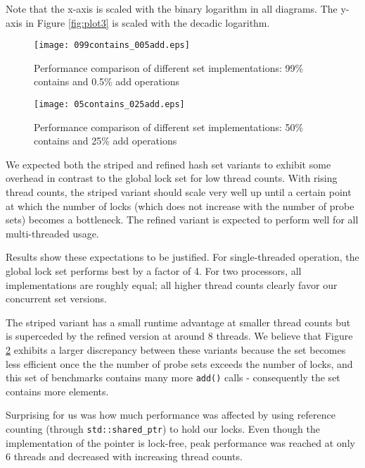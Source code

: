 \documentclass[a4paper,10pt]{article}
\begin{document}
Note that the x-axis is scaled with the binary logarithm in all diagrams. The
y-axis in Figure \ref{fig:plot3} is scaled with the decadic logarithm.

\begin{figure}[H]
\begin{center}
\texttt{[image: 099contains\_005add.eps]}
\end{center}
\caption{Performance comparison of different set implementations: 99\% contains
    and 0.5\% add operations}
\label{fig:plot1}
\end{figure}

\begin{figure}[H]
\begin{center}
\texttt{[image: 05contains\_025add.eps]}
\end{center}
\caption{Performance comparison of different set implementations: 50\% contains
    and 25\% add operations}
\label{fig:plot2}
\end{figure}

We expected both the striped and refined hash set variants to exhibit some
overhead in contrast to the global lock set for low thread counts. With rising
thread counts, the striped variant should scale very well up until a certain
point at which the number of locks (which does not increase with the number of
probe sets) becomes a bottleneck. The refined variant is expected to perform
well for all multi-threaded usage.

Results show these expectations to be justified. For single-threaded operation,
the global lock set performs best by a factor of 4. For two processors, all
implementations are roughly equal; all higher thread counts clearly favor
our concurrent set versions.

The striped variant has a small runtime advantage at smaller thread counts but
is superceded by the refined version at around 8 threads. We believe that 
Figure \ref{fig:plot2}
exhibits a larger discrepancy between these variants because the set becomes
less efficient once the the number of probe sets exceeds the number of locks,
and this set of benchmarks contains many more \lstinline|add()| calls - consequently the set contains more elements.

Surprising for us was how much performance was affected by using
reference counting (through \lstinline|std::shared_ptr|) to hold our locks.
Even though the implementation of the pointer is lock-free, peak performance was
reached at only 6 threads and decreased with increasing thread counts.
\end{document}
